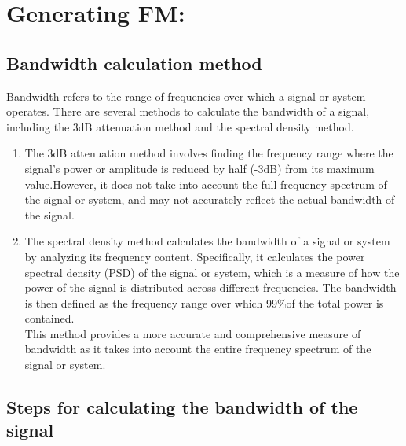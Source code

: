 \documentclass[journal,5pt,twocolumn]{IEEEtran}
\begin{document}
\section{\textbf{Generating FM:}}
\subsection{\textbf{Bandwidth calculation method}}

Bandwidth refers to the range of frequencies over which a signal or system operates. There are several methods to calculate the bandwidth of a signal, including the 3dB attenuation method and the spectral density method.\\
\begin{enumerate}
\item  The 3dB attenuation method involves finding the frequency range where the signal's power or amplitude is reduced by half (-3dB) from its maximum value.However, it does not take into account the full frequency spectrum of the signal or system, and may not accurately reflect the actual bandwidth of the signal.

\item The spectral density method calculates the bandwidth of a signal or system by analyzing its frequency content. Specifically, it calculates the power spectral density (PSD) of the signal or system, which is a measure of how the power of the signal is distributed across different frequencies. The bandwidth is then defined as the frequency range over which 99\%of the total power is contained.\\
 This method provides a more accurate and comprehensive measure of bandwidth as it takes into account the entire frequency spectrum of the signal or system.
\end{enumerate}

\subsection{\textbf{Steps for calculating the bandwidth of the signal}}
   
\end{document}
